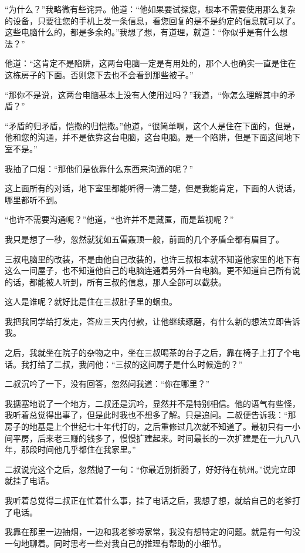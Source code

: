“为什么？”我略微有些诧异。他道：“他如果要试探您，根本不需要使用那么复杂的设备，只要往您的手机上发一条信息，看您回复的是不是约定的信息就可以了。这些电脑什么的，都是多余的。”我想了想，有道理，就道：“你似乎是有什么想法？”

他道：“这肯定不是陷阱，这两台电脑一定是有用处的，那个人也确实一直是住在这栋房子的下面。否则您下去也不会看到那些被子。”

“那你不是说，这两台电脑基本上没有人使用过吗？”我道，“你怎么理解其中的矛盾？”

“矛盾的归矛盾，恺撒的归恺撒。”他道，“很简单啊，这个人是住在下面的，但是，他和您的沟通，并不是依靠这台电脑，这台电脑。是一个陷阱，但是下面这间地下室不是。”

我抽了口烟：“那他们是依靠什么东西来沟通的呢？”

这上面所有的对话，地下室里都能听得一淸二楚，但是我能肯定，下面的人说话，哪里都听不到。

“也许不需要沟通呢？”他道，“也许并不是藏匿，而是监视呢？”

我只是想了一秒，忽然就犹如五雷轰顶一般，前面的几个矛盾全都有眉目了。

三叔电脑里的改装，不是由他自己改装的，也许三叔根本就不知道他家里的地下有这么一间屋子，也不知道他自己的电脑连通着另外一台电脑。更不知道自己所有说的话，都能被人听到，所有三叔的信息，那人全部可以截获。

这人是谁呢？就好比是住在三叔肚子里的蛔虫。

我把我同学给打发走，答应三天内付款，让他继续琢磨，有什么新的想法立即告诉我。

之后，我就坐在院子的杂物之中，坐在三叔喝茶的台子之后，靠在椅子上打了个电话。我打给了二叔，我问他：“三叔的这间房子是什么时候造的？”

二叔沉吟了一下，没有回答，忽然问我道：“你在哪里？”

我搪塞地说了一个地方，二叔还是沉吟，显然并不是特别相信。他的语气有些怪，我听着总觉得出事了，但是此时我也不想多了解。只是追问。二叔便告诉我：“那房子的地基是上个世纪七十年代打的，之后重修过几次就不知道了。最初只有一小间平房，后来老三赚的钱多了，慢慢扩建起来。时间最长的一次扩建是在一九八八年，那段时间他几乎都住在我家里。”

二叔说完这个之后，忽然抛了一句：“你最近别折腾了，好好待在杭州。”说完立即就挂了电话。

我听着总觉得二叔正在忙着什么事，挂了电话之后，我想了想，就给自己的老爹打了电话。

我靠在那里一边抽烟，一边和我老爹唠家常，我没有想特定的问题。就是有一句没一句地聊着。同时思考一些对我自己的推理有帮助的小细节。

